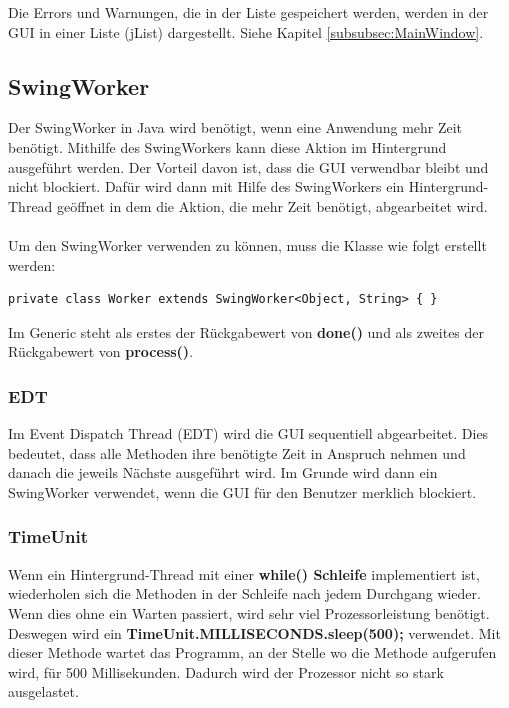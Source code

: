 Die Errors und Warnungen, die in der Liste gespeichert werden, werden in der GUI in einer Liste (jList) dargestellt. Siehe Kapitel \ref{subsubsec:MainWindow}. 

\subsection{SwingWorker}
Der SwingWorker in Java wird benötigt, wenn eine Anwendung mehr Zeit benötigt. Mithilfe des SwingWorkers kann diese Aktion im Hintergrund ausgeführt werden. Der Vorteil davon ist, dass die GUI verwendbar bleibt und nicht blockiert. Dafür wird dann mit Hilfe des SwingWorkers ein Hintergrund-Thread geöffnet in dem die Aktion, die mehr Zeit benötigt, abgearbeitet wird.
\\ \\ Um den SwingWorker verwenden zu können, muss die Klasse wie folgt erstellt werden:
\begin{lstlisting}[style=JavaStyle]
	private class Worker extends SwingWorker<Object, String> { } 
\end{lstlisting}
Im Generic steht als erstes der Rückgabewert von \textbf{done()} und als zweites der Rückgabewert von \textbf{process()}.

\subsubsection{EDT}
Im Event Dispatch Thread (EDT) wird die GUI sequentiell abgearbeitet. Dies bedeutet, dass alle Methoden ihre benötigte Zeit in Anspruch nehmen und danach die jeweils Nächste ausgeführt wird. Im Grunde wird dann ein SwingWorker verwendet, wenn die GUI für den Benutzer merklich blockiert. 

\subsubsection{TimeUnit}
Wenn ein Hintergrund-Thread mit einer \textbf{while() Schleife} implementiert ist, wiederholen sich die Methoden in der Schleife nach jedem Durchgang wieder. Wenn dies ohne ein Warten passiert, wird sehr viel Prozessorleistung benötigt. Deswegen wird ein \textbf{TimeUnit.MILLISECONDS.sleep(500);} verwendet. Mit dieser Methode wartet das Programm, an der Stelle wo die Methode aufgerufen wird, für 500 Millisekunden. Dadurch wird der Prozessor nicht so stark ausgelastet. 

